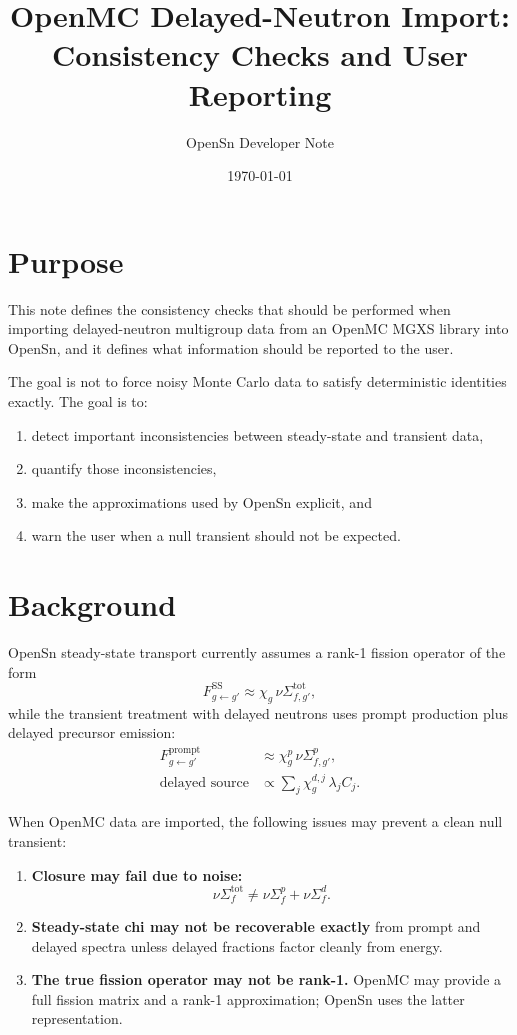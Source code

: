 \documentclass[11pt]{article}
\title{OpenMC Delayed-Neutron Import:\\
Consistency Checks and User Reporting}
\author{OpenSn Developer Note}
\date{\today}
\begin{document}
\maketitle

\section{Purpose}

This note defines the consistency checks that should be performed when importing
delayed-neutron multigroup data from an OpenMC MGXS library into OpenSn, and it
defines what information should be reported to the user.

The goal is not to force noisy Monte Carlo data to satisfy deterministic
identities exactly. The goal is to:
\begin{enumerate}[label=\arabic*.]
  \item detect important inconsistencies between steady-state and transient data,
  \item quantify those inconsistencies,
  \item make the approximations used by OpenSn explicit, and
  \item warn the user when a null transient should not be expected.
\end{enumerate}

\section{Background}

OpenSn steady-state transport currently assumes a rank-1 fission operator of the form
\begin{equation}
  F_{g \leftarrow g'}^{\mathrm{SS}} \approx \chi_g \, \nu \Sigma_{f,g'}^{\mathrm{tot}},
\end{equation}
while the transient treatment with delayed neutrons uses prompt production plus
delayed precursor emission:
\begin{align}
  F_{g \leftarrow g'}^{\mathrm{prompt}} &\approx \chi^{p}_g \, \nu \Sigma_{f,g'}^{p}, \\
  \text{delayed source} &\propto \sum_j \chi^{d,j}_g \, \lambda_j C_j.
\end{align}

When OpenMC data are imported, the following issues may prevent a clean null transient:
\begin{enumerate}[label=\arabic*.]
  \item \textbf{Closure may fail due to noise:}
  \begin{equation}
    \nu \Sigma_f^{\mathrm{tot}} \neq \nu \Sigma_f^p + \nu \Sigma_f^d.
  \end{equation}

  \item \textbf{Steady-state chi may not be recoverable exactly} from prompt and delayed
  spectra unless delayed fractions factor cleanly from energy.

  \item \textbf{The true fission operator may not be rank-1.}
  OpenMC may provide a full fission matrix and a rank-1 approximation; OpenSn uses the
  latter representation.
\end{enumerate}
\end{document}
